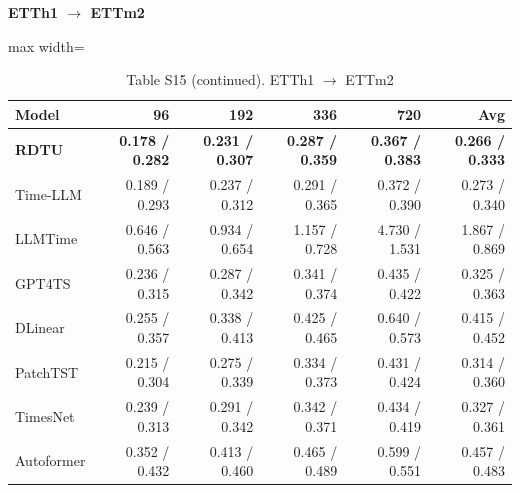 \begin{table}[H]\centering\small
\caption*{Table S15 (continued). ETTh1 $\to$ ETTm2}
\textbf{ETTh1 $\to$ ETTm2}\par\smallskip
\begin{adjustbox}{max width=\linewidth}\begin{tabular}{lrrrrr}\toprule
\textbf{Model} & \textbf{96} & \textbf{192} & \textbf{336} & \textbf{720} & \textbf{Avg}\\\midrule
\rowcolor{blue!5}
\textbf{RDTU} & \textbf{0.178 / 0.282} & \textbf{0.231 / 0.307} & \textbf{0.287 / 0.359} & \textbf{0.367 / 0.383} & \textbf{0.266 / 0.333}\\
Time-LLM & 0.189 / 0.293 & 0.237 / 0.312 & 0.291 / 0.365 & 0.372 / 0.390 & 0.273 / 0.340\\
LLMTime & 0.646 / 0.563 & 0.934 / 0.654 & 1.157 / 0.728 & 4.730 / 1.531 & 1.867 / 0.869\\
GPT4TS & 0.236 / 0.315 & 0.287 / 0.342 & 0.341 / 0.374 & 0.435 / 0.422 & 0.325 / 0.363\\
DLinear & 0.255 / 0.357 & 0.338 / 0.413 & 0.425 / 0.465 & 0.640 / 0.573 & 0.415 / 0.452\\
PatchTST & 0.215 / 0.304 & 0.275 / 0.339 & 0.334 / 0.373 & 0.431 / 0.424 & 0.314 / 0.360\\
TimesNet & 0.239 / 0.313 & 0.291 / 0.342 & 0.342 / 0.371 & 0.434 / 0.419 & 0.327 / 0.361\\
Autoformer & 0.352 / 0.432 & 0.413 / 0.460 & 0.465 / 0.489 & 0.599 / 0.551 & 0.457 / 0.483\\
\bottomrule\end{tabular}\end{adjustbox}\end{table}
